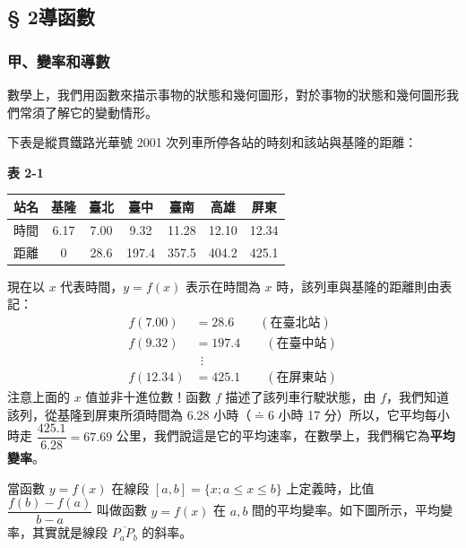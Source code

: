 \subsection*{§ 2\quad 導函數}\label{subsec:b6-app4-2}
\setcounter{theorem}{0}
\renewcommand{\thetheorem}{2.\arabic{theorem}}

\subsubsection*{甲、變率和導數}

數學上，我們用函數來描示事物的狀態和幾何圖形，對於事物的狀態和幾何圖形我們常須了解它的變動情形。

下表是縱貫鐵路光華號 2001 次列車所停各站的時刻和該站與基隆的距離：

\begin{center}
\textbf{表 2-1}

\renewcommand{\arraystretch}{1.2}
\begin{tabular}{|c|c|c|c|c|c|c|}
\hline
站名 & 基隆 & 臺北 & 臺中 & 臺南 & 高雄 & 屏東 \\ \hline
時間 & 6.17 & 7.00 & 9.32 & 11.28 & 12.10 & 12.34 \\ \hline
距離 & 0 & 28.6 & 197.4 & 357.5 & 404.2 & 425.1 \\ \hline
\end{tabular}
\end{center}

現在以 $x$ 代表時間，$y=f(x)$ 表示在時間為 $x$ 時，該列車與基隆的距離則由表記：
\begin{align*}
f(7.00) &= 28.6 \qquad (\text{在臺北站}) \\
f(9.32) &= 197.4 \qquad (\text{在臺中站}) \\
&\ \ \vdots \\
f(12.34) &= 425.1 \qquad (\text{在屏東站})
\end{align*}
注意上面的 $x$ 值並非十進位數！函數 $f$ 描述了該列車行駛狀態，由 $f$，我們知道該列，從基隆到屏東所須時間為 6.28 小時（$\doteq 6$ 小時 17 分）所以，它平均每小時走 $\dfrac{425.1}{6.28} = 67.69$ 公里，我們說這是它的平均速率，在數學上，我們稱它為\textbf{平均變率}。

當函數 $y=f(x)$ 在線段 $[a, b] = \{x; a\le x\le b\}$ 上定義時，比值 $\dfrac{f(b)-f(a)}{b-a}$ 叫做函數 $y=f(x)$ 在 $a, b$ 間的平均變率。如下圖所示，平均變率，其實就是線段 $\overline{P_a P_b}$ 的斜率。

